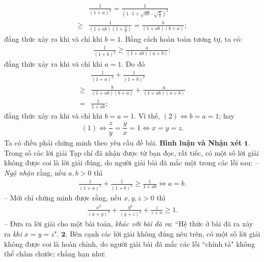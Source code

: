 \begin{multicols}{2}
\begin{align*}
		&\frac{1}{{{{\left( {1 + a} \right)}^2}}} = \frac{1}{{{{\left( {1 \cdot 1 + \sqrt {ab}  \cdot \sqrt {\frac{a}{b}} } \right)}^2}}} \\[-0.4ex]
		\ge &\frac{1}{{\left( {1 + ab} \right)\left( {1 + \frac{a}{b}} \right)}}= \frac{b}{{\left( {1 + ab} \right)\left( {b + a} \right)}};
	\end{align*}
	đẳng thức xảy ra khi và chỉ khi $b = 1$.
	\vskip 0.05cm
	Bằng cách hoàn toàn tương tự, ta có:
	\begin{align*}
		\frac{1}{{{{\left( {1 + b} \right)}^2}}} \ge \frac{a}{{\left( {1 + ab} \right)\left( {a + b} \right)}};
	\end{align*}
	đẳng thức xảy ra khi và chỉ khi $a = 1$.
	\vskip 0.05cm
	Do đó
	\begin{align*}
		&\frac{1}{{{{\left( {1 + a} \right)}^2}}} + \frac{1}{{{{\left( {1 + b} \right)}^2}}} \\[-0.4ex]
		\ge &\frac{b}{{\left( {1 + ab} \right)\left( {b + a} \right)}} + \frac{a}{{\left( {1 + ab} \right)\left( {a + b} \right)}} \\[-0.4ex]
		= &\frac{1}{{1 + ab}};
	\end{align*}
	đẳng thức xảy ra khi và chỉ khi $b = a = 1$.
	\vskip 0.05cm
	Vì thế, $(2) \Leftrightarrow b = a = 1$; hay
	\begin{align*}
		(1)  \Leftrightarrow  \dfrac{z}{y} = \dfrac{y}{x} = 1  \Leftrightarrow  x = y = z.
	\end{align*}
	Ta có điều phải chứng minh theo yêu cầu đề bài.
	\vskip 0.05cm
	\textbf{\color{thachthuctoanhoc}Bình luận và Nhận xét}
	\vskip 0.05cm
	$\pmb{1.}$ Trong số các lời giải Tạp chí đã nhận được từ bạn đọc, rất tiếc, có một số lời giải không được coi là lời giải đúng, do người giải bài đã mắc một trong các lỗi sau:
	\vskip 0.05cm
	-- \textit{Ngộ nhận} rằng, nếu $a, b > 0$ thì
	\begin{align*}
		\frac{1}{{{{\left( {1 \!+\! a} \right)}^2}}} \!+\! \frac{1}{{{{\left( {1 \!+\! b} \right)}^2}}} \!\ge\! \frac{1}{{1 \!+\! ab}} \!\Leftrightarrow\! a \!=\!b.
	\end{align*}
	-- Mới chỉ chứng minh được rằng, nếu $x, y, z > 0$ thì
	\begin{align*}
		\frac{{{x^2}}}{{{{\left( {x + y} \right)}^2}}} + \frac{{{y^2}}}{{{{\left( {y + z} \right)}^2}}} + \frac{z}{{z + x}} \ge 1.
	\end{align*}
	-- Đưa ra lời giải cho một bài toán, \textit{khác với bài đã ra}: ``Hệ thức ở bài đã ra xảy ra \textit{khi} $x = y = z$".
	\vskip 0.05cm
	$\pmb{2.}$ Bên cạnh các lời giải không đúng nêu trên, có một số lời giải không được coi là hoàn chỉnh, do người giải bài đã mắc các lỗi ``chính tả" không thể châm chước; chẳng hạn như:

\end{multicols}
